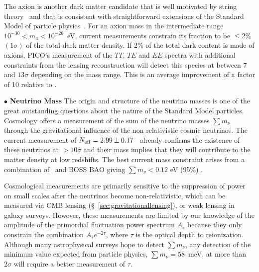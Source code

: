 \documentclass[PICOReport.tex]{subfiles}
\begin{document}
The axion is another dark matter candidate that is well motivated by string theory~\citep{Arvanitaki_etal} and that is consistent with straightforward extensions of the Standard Model of particle physics~\citep{peccei,weinberg,wilczek}. For an axion mass in the intermediate range $10^{-30} < m_a< 10^{-26} $~eV, current measurements constrain its fraction to be $\le 2$\% $(1\sigma)$ of the total dark-matter density. If 2\% of the total dark content is made of axions, PICO's measurement of the $TT$, $TE$ and $EE$ spectra with additional constraints from the lensing reconstruction will detect this species at between $7$ and $13\sigma$ depending on the mass range. %
This is an average improvement of a factor of 10 relative to \planck .

\noindent$\bullet$ {\bf Neutrino Mass} \hspace{0.1in} \label{neutrino_fundamental} The origin and structure of the neutrino masses is one of the great outstanding  questions about the nature of the Standard Model particles.  
Cosmology offers a  measurement of the sum of the neutrino masses $\sum m_\nu$ through the gravitational influence of the non-relativistic  cosmic neutrinos.  The current measurement of ${N_{\rm eff}} = 2.99 \pm 0.17$~\citep{Planck2018_VI} already confirms the existence of these neutrinos at $>10\sigma$ and their mass implies that they will contribute to the matter density at low redshifts.  The best current mass constraint arises from a combination of  \planck~and BOSS \ac{BAO} giving $\sum m_\nu < 0.12$ eV (95\%) \cite{Planck2018_VI}.

Cosmological measurements are primarily sensitive to the suppression of power on small scales after the neutrinos become non-relativistic, which can be measured via CMB lensing (\S~\ref{sec:gravitationallensing}), or weak lensing in galaxy surveys.  However, these measurements are limited by our knowledge of the amplitude of the primordial fluctuation power spectrum $A_s$ because they only constrain the combination $A_s e^{-2 \tau}$, where $\tau$ is the optical depth to reionization. Although many astrophysical surveys hope to detect $\sum m_\nu$, any detection of the minimum value expected from particle physics, $\sum m_\nu = 58$~meV, at more than $2 \sigma$ will require a better measurement of $\tau$.
\end{document}
